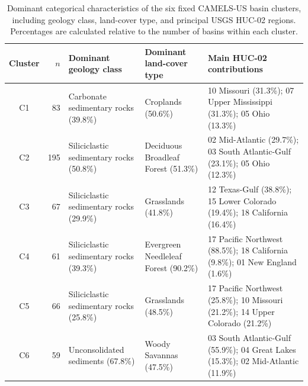 \begin{table}[!htbp]
\centering
\caption{Dominant categorical characteristics of the six fixed CAMELS-US basin clusters, including geology class, land-cover type, and principal USGS HUC-02 regions. Percentages are calculated relative to the number of basins within each cluster.}
\label{tab:supp_cluster_categorical}
\footnotesize
\setlength{\tabcolsep}{3.5pt}
\renewcommand{\arraystretch}{1.18}
\begin{tabularx}{\textwidth}{c r X X X}
\toprule
Cluster & $n$ & Dominant geology class & Dominant land-cover type & Main HUC-02 contributions \\
\midrule
C1 & 83
& Carbonate sedimentary rocks (39.8\%)
& Croplands (50.6\%)
& 10 Missouri (31.3\%); 07 Upper Mississippi (31.3\%); 05 Ohio (13.3\%) \\

C2 & 195
& Siliciclastic sedimentary rocks (50.8\%)
& Deciduous Broadleaf Forest (51.3\%)
& 02 Mid-Atlantic (29.7\%); 03 South Atlantic-Gulf (23.1\%); 05 Ohio (12.3\%) \\

C3 & 67
& Siliciclastic sedimentary rocks (29.9\%)
& Grasslands (41.8\%)
& 12 Texas-Gulf (38.8\%); 15 Lower Colorado (19.4\%); 18 California (16.4\%) \\

C4 & 61
& Siliciclastic sedimentary rocks (39.3\%)
& Evergreen Needleleaf Forest (90.2\%)
& 17 Pacific Northwest (88.5\%); 18 California (9.8\%); 01 New England (1.6\%) \\

C5 & 66
& Siliciclastic sedimentary rocks (25.8\%)
& Grasslands (48.5\%)
& 17 Pacific Northwest (25.8\%); 10 Missouri (21.2\%); 14 Upper Colorado (21.2\%) \\

C6 & 59
& Unconsolidated sediments (67.8\%)
& Woody Savannas (47.5\%)
& 03 South Atlantic-Gulf (55.9\%); 04 Great Lakes (15.3\%); 02 Mid-Atlantic (11.9\%) \\
\bottomrule
\end{tabularx}
\end{table}

